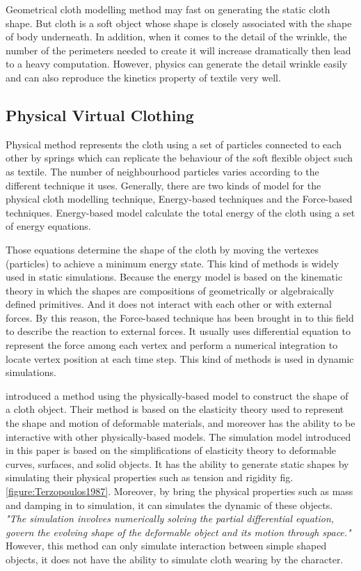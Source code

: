 Geometrical cloth modelling method may fast on generating the static cloth shape. But cloth is a soft object whose shape is closely associated with the shape of body underneath. In addition, when it comes to the detail of the wrinkle, the number of the perimeters needed to create it will increase dramatically then lead to a heavy computation.  However, physics can generate the detail wrinkle easily and can also reproduce the kinetics property of textile very well.

\subsection{Physical Virtual Clothing}
Physical method represents the cloth using a set of particles connected to each other by springs which can replicate the behaviour of the soft flexible object such as textile. The number of neighbourhood particles varies according to the different technique it uses. Generally, there are two kinds of model for the physical cloth modelling technique, Energy-based techniques and the Force-based techniques. Energy-based model calculate the total energy of the cloth using a set of energy equations.
 
Those equations determine the shape of the cloth by moving the vertexes (particles) to achieve a minimum energy state. This kind of methods is widely used in static simulations. Because the energy model is based on the kinematic theory in which the shapes are compositions of geometrically or algebraically defined primitives. And it does not interact with each other or with external forces. By this reason, the Force-based technique has been brought in to this field to describe the reaction to external forces. It usually uses differential equation to represent the force among each vertex and perform a numerical integration to locate vertex position at each time step. This kind of methods is used in dynamic simulations. 


\cite{Terzopoulos1987} introduced a method using the physically-based model to construct the shape of a cloth object. Their method is based on the elasticity theory used to represent the shape and motion of deformable materials, and moreover has the ability to be interactive with other physically-based models. The simulation model introduced in this paper is based on the simplifications of elasticity theory to deformable curves, surfaces, and solid objects. It has the ability to generate static shapes by simulating their physical properties such as tension and rigidity fig.\ref{figure:Terzopoulos1987}. Moreover, by bring the physical properties such as mass and damping in to simulation, it can simulates the dynamic of these objects. \textit{"The simulation involves numerically solving the partial differential equation, govern the evolving shape of the deformable object and its motion through space."} \cite{Terzopoulos1987} However, this method can only simulate interaction between simple shaped objects, it does not have the ability to simulate cloth wearing by the character.


